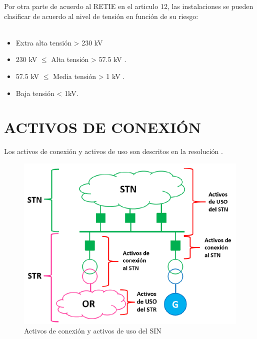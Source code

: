 \documentclass[a5paper]{book}%
\begin{document}
Por otra parte de acuerdo  al \ac{RETIE} \cite{RETIE2013} en el articulo 12, las instalaciones se pueden clasificar de acuerdo al nivel de tensión en función de su riesgo:\\\\
\begin{itemize}
\item Extra alta tensión > 230 kV
\item  230 kV  $\leqslant$ Alta tensión  > 57.5 kV .
\item 57.5 kV  $\leqslant$ Media tensión  > 1 kV .
\item Baja tensión < 1kV.
\end{itemize}

\section{ACTIVOS DE CONEXIÓN}

Los activos de conexión y activos de uso son descritos en  la resolución \cite{CREG0972008}. 

\begin{figure}[H]
  \centering
  \caption{Activos de conexión y activos de uso del \ac{SIN}}
  \label{fig:activosdeuso}
  \includegraphics[width=\linewidth]{activos_de_conexion}
\end{figure}
\end{document}
